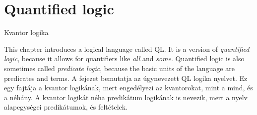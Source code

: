 
\chapter{Quantified logic}
Kvantor logika 
\label{ch.QL}

This chapter introduces a logical language called QL. It is a version of \emph{quantified logic}, because it allows for quantifiers like \emph{all} and \emph{some}. Quantified logic is also sometimes called \emph{predicate logic}, because the basic units of the language are predicates and terms.
A fejezet bemutatja az úgynevezett QL logika nyelvet. Ez egy fajtája a kvantor logikának, mert engedélyezi az kvantorokat, mint a mind, és a néhány. A kvantor logikát néha predikátum logikának is nevezik, mert a nyelv alapegységei predikátumok, és feltételek.

